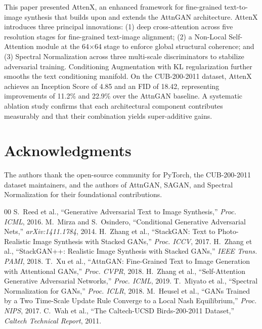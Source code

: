 \documentclass[conference]{IEEEtran}
\begin{document}
This paper presented AttenX, an enhanced framework for fine-grained text-to-image synthesis that builds upon and extends the AttnGAN architecture. AttenX introduces three principal innovations: (1) deep cross-attention across five resolution stages for fine-grained text-image alignment; (2) a Non-Local Self-Attention module at the 64$\times$64 stage to enforce global structural coherence; and (3) Spectral Normalization across three multi-scale discriminators to stabilize adversarial training. Conditioning Augmentation with KL regularization further smooths the text conditioning manifold. On the CUB-200-2011 dataset, AttenX achieves an Inception Score of 4.85 and an FID of 18.42, representing improvements of 11.2\% and 22.9\% over the AttnGAN baseline. A systematic ablation study confirms that each architectural component contributes measurably and that their combination yields super-additive gains.

\section*{Acknowledgments}
The authors thank the open-source community for PyTorch, the CUB-200-2011 dataset maintainers, and the authors of AttnGAN, SAGAN, and Spectral Normalization for their foundational contributions.

\begin{thebibliography}{00}
 S.~Reed et al., ``Generative Adversarial Text to Image Synthesis,'' \emph{Proc. ICML}, 2016.
 M.~Mirza and S.~Osindero, ``Conditional Generative Adversarial Nets,'' \emph{arXiv:1411.1784}, 2014.
 H.~Zhang et al., ``StackGAN: Text to Photo-Realistic Image Synthesis with Stacked GANs,'' \emph{Proc. ICCV}, 2017.
 H.~Zhang et al., ``StackGAN++: Realistic Image Synthesis with Stacked GANs,'' \emph{IEEE Trans. PAMI}, 2018.
 T.~Xu et al., ``AttnGAN: Fine-Grained Text to Image Generation with Attentional GANs,'' \emph{Proc. CVPR}, 2018.
 H.~Zhang et al., ``Self-Attention Generative Adversarial Networks,'' \emph{Proc. ICML}, 2019.
 T.~Miyato et al., ``Spectral Normalization for GANs,'' \emph{Proc. ICLR}, 2018.
 M.~Heusel et al., ``GANs Trained by a Two Time-Scale Update Rule Converge to a Local Nash Equilibrium,'' \emph{Proc. NIPS}, 2017.
 C.~Wah et al., ``The Caltech-UCSD Birds-200-2011 Dataset,'' \emph{Caltech Technical Report}, 2011.
\end{thebibliography}
\end{document}
